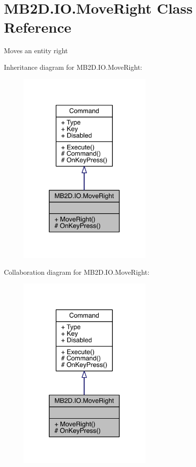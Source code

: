 \hypertarget{class_m_b2_d_1_1_i_o_1_1_move_right}{}\section{M\+B2\+D.\+I\+O.\+Move\+Right Class Reference}
\label{class_m_b2_d_1_1_i_o_1_1_move_right}


Moves an entity right  




Inheritance diagram for M\+B2\+D.\+I\+O.\+Move\+Right\+:
\nopagebreak
\begin{figure}[H]
\begin{center}
\leavevmode
\includegraphics[width=188pt]{class_m_b2_d_1_1_i_o_1_1_move_right__inherit__graph}
\end{center}
\end{figure}


Collaboration diagram for M\+B2\+D.\+I\+O.\+Move\+Right\+:
\nopagebreak
\begin{figure}[H]
\begin{center}
\leavevmode
\includegraphics[width=188pt]{class_m_b2_d_1_1_i_o_1_1_move_right__coll__graph}
\end{center}
\end{figure}
